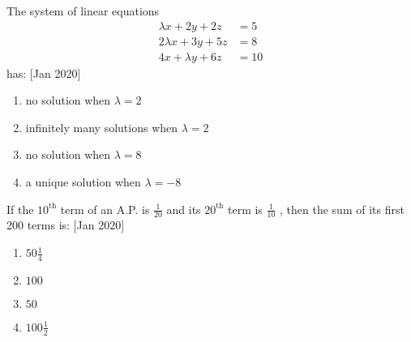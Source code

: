     
    \item The system of linear equations
    \begin{align*}
        \lambda x + 2y + 2z &= 5 \\
        2\lambda x + 3y + 5z &= 8 \\
        4x + \lambda y + 6z &= 10     
    \end{align*}
    has: \hfill [Jan 2020]
    
    \begin{multicols}{2}
        \begin{enumerate}
            \item no solution when $\lambda = 2$
            \item infinitely many solutions when $\lambda = 2$
            \columnbreak
            \item no solution when $\lambda = 8$
            \item a unique solution when $\lambda = -8$
        \end{enumerate}
    \end{multicols}
    
    \item If the $10^\text{th}$ term of an A.P. is $\frac{1}{20}$ and its $20^\text{th}$ term is $\frac{1}{10}$ , then the sum of its first 200 terms is: \hfill [Jan 2020]
    \begin{multicols}{2}
        \begin{enumerate}
            \item $50 \frac{1}{4}$
            \item $100$
            \columnbreak
            \item $50$
            \item $100 \frac{1}{2}$
        \end{enumerate}
    \end{multicols}

